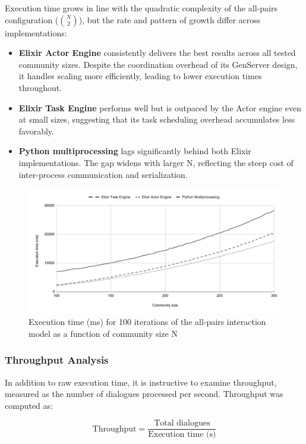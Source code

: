 \documentclass[
]{ceurart}
\begin{document}
Execution time grows in line with the quadratic complexity of the all-pairs configuration ($\binom{N}{2}$), but the rate and pattern of growth differ across implementations:

\begin{itemize}
\item \textbf{Elixir Actor Engine} consistently delivers the best results across all tested community sizes. Despite the coordination overhead of its GenServer design, it handles scaling more efficiently, leading to lower execution times throughout.
\item \textbf{Elixir Task Engine} performs well but is outpaced by the Actor engine even at small sizes, suggesting that its task scheduling overhead accumulates less favorably.
\item \textbf{Python multiprocessing} lags significantly behind both Elixir implementations. The gap widens with larger N, reflecting the steep cost of inter-process communication and serialization.
\end{itemize}

\begin{figure}
  \centering
  \includegraphics[width=\linewidth]{images/wall_time_community_100-300.pdf} %
  \caption{Execution time (ms) for 100 iterations of the all-pairs interaction model as a function of community size N}
\end{figure}

\subsubsection{Throughput Analysis}

In addition to raw execution time, it is instructive to examine throughput, measured as the number of dialogues processed per second. Throughput was computed as:

\[\text{Throughput} = \frac{\text{Total dialogues}}{\text{Execution time (s)}}\]
\end{document}

